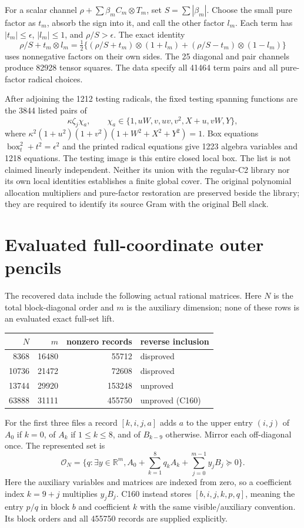 \documentclass[11pt]{article}
\newcommand{\R}{\mathbb R}
\begin{document}
For a scalar channel $\rho+\sum\beta_mC_m\otimes T_m$, set
$S=\sum|\beta_m|$. Choose the small pure factor as $t_m$, absorb
the sign into it, and call the other factor $l_m$. Each term has
$|t_m|\leq\epsilon$, $|l_m|\leq1$, and $\rho/S>\epsilon$.
The exact identity
\[
 \rho/S+t_m\otimes l_m
 =\tfrac12\{(\rho/S+t_m)\otimes(1+l_m)
              +(\rho/S-t_m)\otimes(1-l_m)\}
\]
uses nonnegative factors on their own sides. The 25 diagonal and pair
channels produce 82928 tensor squares. The data specify all 41464 term
pairs and all pure-factor radical choices.

After adjoining the 1212 testing radicals, the fixed testing spanning
functions are the 3844 listed pairs of
\[
 \kappa\zeta_j\chi_a,\qquad
 \chi_a\in\{1,uW,v,uv,v^2,X+u,vW,Y\},
\]
where
$\kappa^2(1+u^2)(1+v^2)(1+W^2+X^2+Y^2)=1$.
Box equations $\operatorname{box}_t^2+t^2=\epsilon^2$ and the
printed radical equations give 1223 algebra variables and 1218 equations.
The testing image is this entire closed local box. The list is not
claimed linearly independent. Neither its union with the regular-C2
library nor its own local identities establishes a finite global cover.
The original polynomial allocation multipliers and pure-factor
restoration are preserved beside the library; they are required to
identify its source Gram with the original Bell slack.

\section{Evaluated full-coordinate outer pencils}

The recovered data include the following actual rational matrices.
Here $N$ is the total block-diagonal order and $m$ is the auxiliary
dimension; none of these rows is an evaluated exact full-set lift.
\begin{center}
\begin{tabular}{rrrl}
\toprule
$N$&$m$&nonzero records&reverse inclusion\\\midrule
8368&16480&55712&disproved\\
10736&21472&72608&disproved\\
13744&29920&153248&unproved\\
63888&31111&455750&unproved (C160)\\\bottomrule
\end{tabular}
\end{center}
For the first three files a record $[k,i,j,a]$ adds $a$ to the upper
entry $(i,j)$ of $A_0$ if $k=0$, of $A_k$ if $1\leq k\leq8$, and
of $B_{k-9}$ otherwise. Mirror each off-diagonal once. The represented
set is
\[
 \mathcal O_N=\{q:\exists y\in\R^m,
                A_0+\sum_{k=1}^8q_kA_k+\sum_{j=0}^{m-1}y_jB_j\succeq0\}.
\]
Here the auxiliary variables and matrices are indexed from zero,
so a coefficient index $k=9+j$ multiplies $y_jB_j$.
C160 instead stores $[b,i,j,k,p,q]$, meaning the entry $p/q$ in
block $b$ and coefficient $k$ with the same visible/auxiliary convention.
Its block orders and all 455750 records are supplied explicitly.
\end{document}
